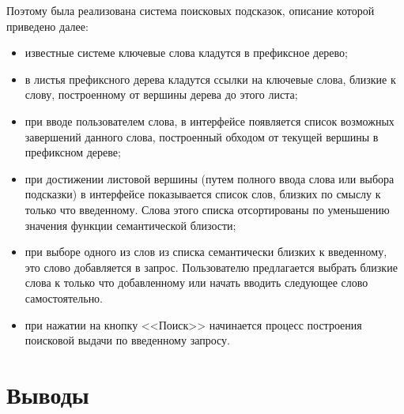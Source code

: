 Поэтому была реализована система поисковых подсказок, описание которой приведено далее:
\begin{itemize}
    \item известные системе ключевые слова кладутся в префиксное дерево;
    \item в листья префиксного дерева кладутся ссылки на ключевые слова, близкие к слову, построенному от вершины дерева до этого листа;
    \item при вводе пользователем слова, в интерфейсе появляется список возможных завершений данного слова, построенный обходом от текущей вершины в префиксном дереве;
    \item при достижении листовой вершины (путем полного ввода слова или выбора подсказки) в интерфейсе показывается список слов, близких по смыслу к только что введенному. Слова этого списка отсортированы по уменьшению значения функции семантической близости;
    \item при выборе одного из слов из списка семантически близких к введенному, это слово добавляется в запрос. Пользователю предлагается выбрать близкие слова к только что добавленному или начать вводить следующее слово самостоятельно.
    \item при нажатии на кнопку <<Поиск>> начинается процесс построения поисковой выдачи по введенному запросу.
\end{itemize}
        
\section{Выводы}
